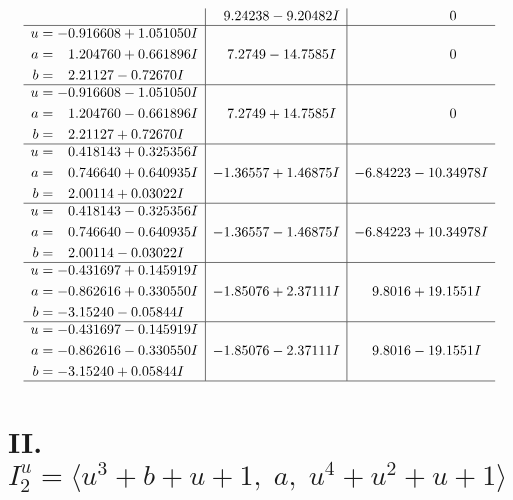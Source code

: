 \documentclass[1p]{elsarticle_modified}
\theoremstyle{definition}
\begin{document}
$$\begin{array}{c|c|c}
 & \phantom{-}9.24238 - 9.20482 I & \phantom{-0.000000 } 0 \\ \hline\begin{aligned}
u &= -0.916608 + 1.051050 I \\
a &= \phantom{-}1.204760 + 0.661896 I \\
b &= \phantom{-}2.21127 - 0.72670 I\end{aligned}
 & \phantom{-}7.2749 - 14.7585 I & \phantom{-0.000000 } 0 \\ \hline\begin{aligned}
u &= -0.916608 - 1.051050 I \\
a &= \phantom{-}1.204760 - 0.661896 I \\
b &= \phantom{-}2.21127 + 0.72670 I\end{aligned}
 & \phantom{-}7.2749 + 14.7585 I & \phantom{-0.000000 } 0 \\ \hline\begin{aligned}
u &= \phantom{-}0.418143 + 0.325356 I \\
a &= \phantom{-}0.746640 + 0.640935 I \\
b &= \phantom{-}2.00114 + 0.03022 I\end{aligned}
 & -1.36557 + 1.46875 I & -6.84223 - 10.34978 I \\ \hline\begin{aligned}
u &= \phantom{-}0.418143 - 0.325356 I \\
a &= \phantom{-}0.746640 - 0.640935 I \\
b &= \phantom{-}2.00114 - 0.03022 I\end{aligned}
 & -1.36557 - 1.46875 I & -6.84223 + 10.34978 I \\ \hline\begin{aligned}
u &= -0.431697 + 0.145919 I \\
a &= -0.862616 + 0.330550 I \\
b &= -3.15240 - 0.05844 I\end{aligned}
 & -1.85076 + 2.37111 I & \phantom{-}9.8016 + 19.1551 I \\ \hline\begin{aligned}
u &= -0.431697 - 0.145919 I \\
a &= -0.862616 - 0.330550 I \\
b &= -3.15240 + 0.05844 I\end{aligned}
 & -1.85076 - 2.37111 I & \phantom{-}9.8016 - 19.1551 I\\
 \hline 
 \end{array}$$\newpage\newpage\renewcommand{\arraystretch}{1}
\centering \section*{II. $I^u_{2}= \langle u^3+b+u+1,\;a,\;u^4+u^2+u+1 \rangle$}
\end{document}
